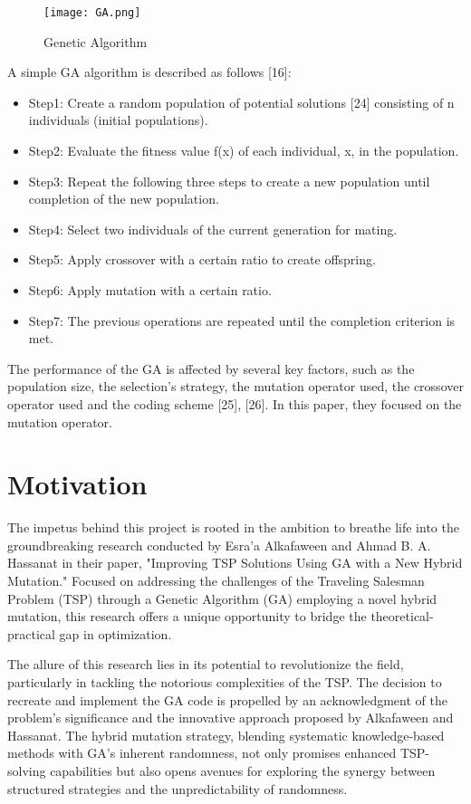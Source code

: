 \documentclass[conference]{IEEEtran}
\begin{document}
\begin{figure}[t!]
\center
\texttt{[image: GA.png]}
\caption{ Genetic Algorithm }
\label{fig}
\end{figure}

A simple GA algorithm is described as follows [16]:
\begin{itemize}
\item Step1: Create a random population of potential solutions [24] consisting of n individuals (initial populations).
\item Step2: Evaluate the fitness value f(x) of each individual, x, in the population. 
\item Step3: Repeat the following three steps to create a new population until completion of the new population.
\item Step4: Select two individuals of the current generation for mating.
\item Step5: Apply crossover with a certain ratio to create offspring.
\item Step6: Apply mutation with a certain ratio.
\item Step7: The previous operations are repeated until the completion criterion is met.
\end{itemize}
The performance of the GA is affected by several key factors, such as the population size, the selection's strategy, the mutation operator used, the crossover operator used and the coding scheme [25], [26]. In this paper, they focused on the mutation operator.




\section{Motivation}
The impetus behind this project is rooted in the ambition to breathe life into the groundbreaking research conducted by Esra'a Alkafaween and Ahmad B. A. Hassanat in their paper, "Improving TSP Solutions Using GA with a New Hybrid Mutation." Focused on addressing the challenges of the Traveling Salesman Problem (TSP) through a Genetic Algorithm (GA) employing a novel hybrid mutation, this research offers a unique opportunity to bridge the theoretical-practical gap in optimization.

The allure of this research lies in its potential to revolutionize the field, particularly in tackling the notorious complexities of the TSP. The decision to recreate and implement the GA code is propelled by an acknowledgment of the problem's significance and the innovative approach proposed by Alkafaween and Hassanat. The hybrid mutation strategy, blending systematic knowledge-based methods with GA's inherent randomness, not only promises enhanced TSP-solving capabilities but also opens avenues for exploring the synergy between structured strategies and the unpredictability of randomness.
\end{document}
